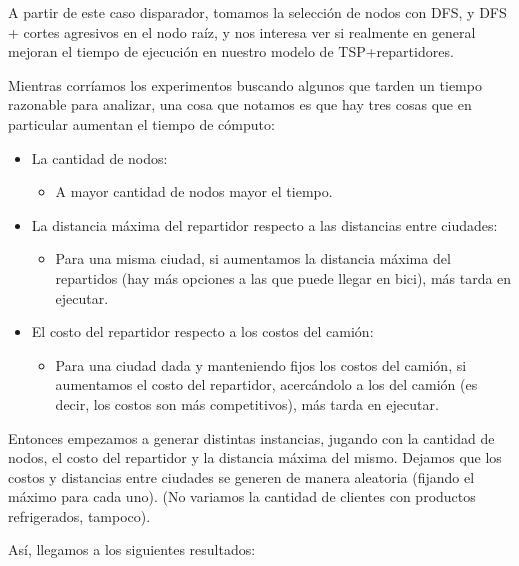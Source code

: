 \documentclass{article}
\begin{document}
    A partir de este caso disparador, tomamos la selección de nodos con DFS, y DFS + cortes agresivos en el nodo raíz, y nos interesa ver si realmente en general mejoran el tiempo de ejecución en nuestro modelo de TSP+repartidores.

    Mientras corríamos los experimentos buscando algunos que tarden un tiempo razonable para analizar, una cosa que notamos es que hay tres cosas que en particular aumentan el tiempo de cómputo:
    \begin{itemize}
        \item La cantidad de nodos:
        \begin{itemize}
            \item A mayor cantidad de nodos mayor el tiempo.
        \end{itemize}

        \item La distancia máxima del repartidor respecto a las distancias entre ciudades:
        \begin{itemize}
            \item Para una misma ciudad, si aumentamos la distancia máxima del repartidos (hay más opciones a las que puede llegar en bici), más tarda en ejecutar.
        \end{itemize}

        \item El costo del repartidor respecto a los costos del camión:
        \begin{itemize}
            \item Para una ciudad dada y manteniendo fijos los costos del camión, si aumentamos el costo del repartidor, acercándolo a los del camión  (es decir, los costos son más competitivos), más tarda en ejecutar.
        \end{itemize}
    \end{itemize}

    Entonces empezamos a generar distintas instancias, jugando con la cantidad de nodos, el costo del repartidor y la distancia máxima del mismo. Dejamos que los costos y distancias entre ciudades se generen de manera aleatoria (fijando el máximo para cada uno). (No variamos la cantidad de clientes con productos refrigerados, tampoco).

    Así, llegamos a los siguientes resultados:
\end{document}
